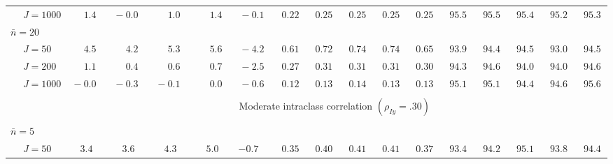 \begin{sidewaystable}
\begin{threeparttable}
\begin{tabular}{llccccccccccccccc}
 & \nopagebreak $\;J=1000$  & $\phantom{0}\phantom{-}1.4\phantom{0}$ & $\phantom{0}{-}0.0\phantom{0}$ & $\phantom{0}\phantom{-}1.0\phantom{0}$ & $\phantom{0}\phantom{-}1.4\phantom{0}$ & $\phantom{0}{-}0.1\phantom{0}$ & $\phantom{0}0.22\phantom{0}$ & $\phantom{0}0.25\phantom{0}$ & $\phantom{0}0.25\phantom{0}$ & $\phantom{0}0.25\phantom{0}$ & $\phantom{0}0.25\phantom{0}$ & $\phantom{0}95.5\phantom{0}$ & $\phantom{0}95.5\phantom{0}$ & $\phantom{0}95.4\phantom{0}$ & $\phantom{0}95.2\phantom{0}$ & $\phantom{0}95.3\phantom{0}$ \\
\multicolumn{4}{l}{$\bar{n}=20$} \\  & \nopagebreak $\;J=50$  & $\phantom{0}\phantom{-}4.5\phantom{0}$ & $\phantom{0}\phantom{-}4.2\phantom{0}$ & $\phantom{0}\phantom{-}5.3\phantom{0}$ & $\phantom{0}\phantom{-}5.6\phantom{0}$ & $\phantom{0}{-}4.2\phantom{0}$ & $\phantom{0}0.61\phantom{0}$ & $\phantom{0}0.72\phantom{0}$ & $\phantom{0}0.74\phantom{0}$ & $\phantom{0}0.74\phantom{0}$ & $\phantom{0}0.65\phantom{0}$ & $\phantom{0}93.9\phantom{0}$ & $\phantom{0}94.4\phantom{0}$ & $\phantom{0}94.5\phantom{0}$ & $\phantom{0}93.0\phantom{0}$ & $\phantom{0}94.5\phantom{0}$ \\
 & \nopagebreak $\;J=200$  & $\phantom{0}\phantom{-}1.1\phantom{0}$ & $\phantom{0}\phantom{-}0.4\phantom{0}$ & $\phantom{0}\phantom{-}0.6\phantom{0}$ & $\phantom{0}\phantom{-}0.7\phantom{0}$ & $\phantom{0}{-}2.5\phantom{0}$ & $\phantom{0}0.27\phantom{0}$ & $\phantom{0}0.31\phantom{0}$ & $\phantom{0}0.31\phantom{0}$ & $\phantom{0}0.31\phantom{0}$ & $\phantom{0}0.30\phantom{0}$ & $\phantom{0}94.3\phantom{0}$ & $\phantom{0}94.6\phantom{0}$ & $\phantom{0}94.0\phantom{0}$ & $\phantom{0}94.0\phantom{0}$ & $\phantom{0}94.6\phantom{0}$ \\
 & \nopagebreak $\;J=1000$  & $\phantom{0}{-}0.0\phantom{0}$ & $\phantom{0}{-}0.3\phantom{0}$ & $\phantom{0}{-}0.1\phantom{0}$ & $\phantom{0}\phantom{-}0.0\phantom{0}$ & $\phantom{0}{-}0.6\phantom{0}$ & $\phantom{0}0.12\phantom{0}$ & $\phantom{0}0.13\phantom{0}$ & $\phantom{0}0.14\phantom{0}$ & $\phantom{0}0.13\phantom{0}$ & $\phantom{0}0.13\phantom{0}$ & $\phantom{0}95.1\phantom{0}$ & $\phantom{0}95.1\phantom{0}$ & $\phantom{0}94.4\phantom{0}$ & $\phantom{0}94.6\phantom{0}$ & $\phantom{0}95.6\phantom{0}$ \\
[0.5ex]\hline\\[-1.6ex] 
& & \multicolumn{15}{c}{Moderate intraclass correlation $(\rho_{Iy}=.30)$} \\[0.6ex]\hline\\[-1.8ex]
\multicolumn{4}{l}{$\bar{n}=5$} \\  & \nopagebreak $\;J=50$  & $\phantom{-}3.4\phantom{0}$ & $\phantom{-}3.6\phantom{0}$ & $\phantom{-}4.3\phantom{0}$ & $\phantom{-}5.0\phantom{0}$ & ${-}0.7\phantom{0}$ & $\phantom{0}0.35\phantom{0}$ & $\phantom{0}0.40\phantom{0}$ & $\phantom{0}0.41\phantom{0}$ & $\phantom{0}0.41\phantom{0}$ & $\phantom{0}0.37\phantom{0}$ & $\phantom{0}93.4\phantom{0}$ & $\phantom{0}94.2\phantom{0}$ & $\phantom{0}95.1\phantom{0}$ & $\phantom{0}93.8\phantom{0}$ & $\phantom{0}94.4\phantom{0}$ \\

\end{tabular}
\end{threeparttable}
\end{sidewaystable}
